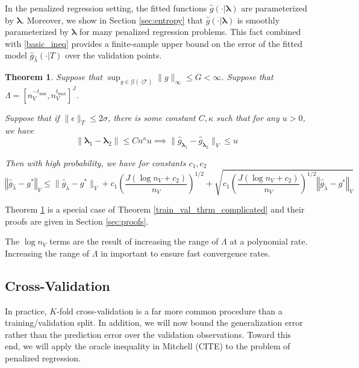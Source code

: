 \documentclass[12pt]{article}
\newtheorem{theorem}{Theorem}
\begin{document}
In the penalized regression setting, the fitted functions $\hat{g}(\cdot | \boldsymbol \lambda)$ are parameterized by $\boldsymbol \lambda$. Moreover, we show in Section \ref{sec:entropy} that $\hat{g}(\cdot | \boldsymbol \lambda)$ is smoothly parameterized by $\boldsymbol \lambda$ for many penalized regression problems. This fact combined with \eqref{basic_ineq} provides a finite-sample upper bound on the error of the fitted model $\hat{g}_{\hat \lambda}(\cdot | T)$ over the validation points.

\begin{theorem}
\label{train_val_thrm}
Suppose that $\sup_{g \in \mathcal{G(\cdot | T)}} \| g \|_\infty \le G < \infty$.
Suppose that $\Lambda = [ n_V^{-t_{\min}}, n_V^{t_{\max}} ]^J $.

Suppose that if $\| \epsilon \|_T \le 2 \sigma $, there is some constant $C, \kappa$ such that for any $u> 0$, we have
\begin{equation}
\| \boldsymbol \lambda_1 - \boldsymbol \lambda_2 \| \le C n^\kappa u \implies \| \hat{g}_{\boldsymbol \lambda_1} - \hat{g}_{\boldsymbol \lambda_2} \|_V \le u
\end{equation}

Then with high probability, we have for constants $c_1, c_2$
\begin{equation}
\label{error_bound}
\left\Vert \hat{g}_{\hat{\lambda}}-g^{*}\right\Vert _{V} \le
\|\hat{g}_{\tilde{\lambda}}-g^{*}\|_{V}
+c_{1} \left (\frac{J(\log n_{V}+c_{2})}{n_{V}} \right )^{1/2}
+\sqrt{ c_{1} \left (\frac{J(\log n_{V}+c_{2})}{n_{V}} \right )^{1/2} \left\Vert \hat{g}_{\tilde{\lambda}}-g^{*}\right\Vert _{V}}
\end{equation}
\end{theorem}
Theorem \ref{train_val_thrm} is a special case of Theorem \ref{train_val_thrm_complicated} and their proofs are given in Section \ref{sec:proofs}.

The $\log n_V$ terms are the result of increasing the range of $\Lambda$ at a polynomial rate. Increasing the range of $\Lambda$ in important to ensure fast convergence rates.



\subsection{Cross-Validation}

In practice, $K$-fold cross-validation is a far more common procedure than a training/validation split. In addition, we will now bound the generalization error rather than the prediction error over the validation observations. Toward this end, we will apply the oracle inequality in Mitchell (CITE) to the problem of penalized regression. 
\end{document}
